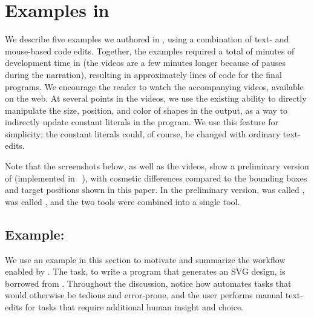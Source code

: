 \section{Examples in \sns{}}
\label{sec:appendix-examples}

We describe five examples we authored in \sns{}, using a
combination of text- and mouse-based code edits.
Together, the \numExamples{} examples required a
total of \timeRawVideos{} minutes of development time in \deuce{} (the videos
are a few minutes longer because of pauses during the narration), resulting in
approximately \locExamples{} lines of \little{} code for the final programs.
%
We encourage the reader to watch the accompanying videos, available on the web.
At several points in the videos, we use the existing \sns{} ability to directly
manipulate the size, position, and color of shapes in the output, as a way to
indirectly update constant literals in the program. We use this feature for
simplicity; the constant literals could, of course, be changed with ordinary
text-edits.


Note that the screenshots below, as well as the videos, show a preliminary
version of \deuce{} (implemented in \sns{}~),
with cosmetic differences compared to the bounding boxes
and target positions shown in this paper. In the preliminary version,
 was called ,
 was called , and the two  tools were combined into a
single tool.


\subsection{Example: \exampleZero{}}

We use an example in this section to motivate and summarize the
workflow enabled by \deuce{}. The task, to write a program that
generates an SVG design, is borrowed from \citet{sns-uist}.
Throughout the discussion, notice how \deuce{} automates tasks
that would otherwise be tedious and error-prone, and the user
performs manual text-edits for tasks that require additional human
insight and choice.


